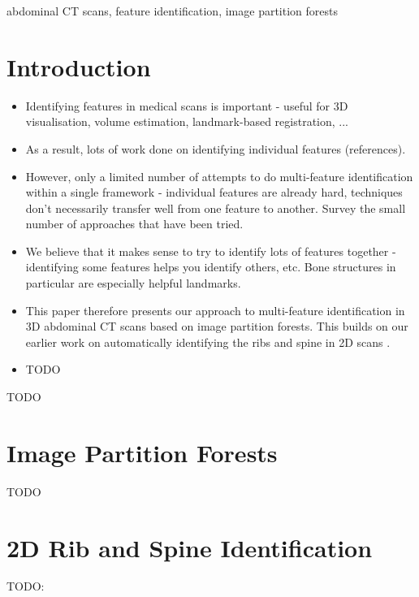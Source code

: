 \documentclass[10pt,twocolumn,twoside]{IEEEtran}
\begin{document}
\begin{IEEEkeywords}
abdominal CT scans, feature identification, image partition forests
\end{IEEEkeywords}

\IEEEpeerreviewmaketitle

\section{Introduction}

\begin{itemize}
\item Identifying features in medical scans is important - useful for 3D visualisation, volume estimation, landmark-based registration, ...
\item As a result, lots of work done on identifying individual features (references).
\item However, only a limited number of attempts to do multi-feature identification within a single framework - individual features are already hard, techniques don't necessarily transfer well from one feature to another. Survey the small number of approaches that have been tried.
\item We believe that it makes sense to try to identify lots of features together - identifying some features helps you identify others, etc. Bone structures in particular are especially helpful landmarks.
\item This paper therefore presents our approach to multi-feature identification in 3D abdominal CT scans based on image partition forests. This builds on our earlier work on automatically identifying the ribs and spine in 2D scans \cite{gvccimi08,gvcispa09}.
\item TODO
\end{itemize}

TODO

\IEEEpubidadjcol

\section{Image Partition Forests}

TODO

\section{2D Rib and Spine Identification}

TODO: \cite{gvccimi08,gvcispa09}
\end{document}
